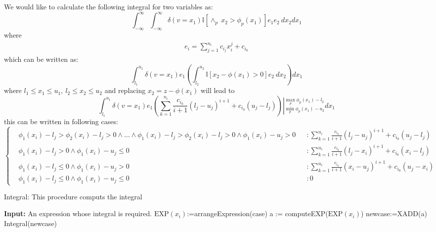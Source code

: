\documentclass[11pt,a4paper]{article}
\newcommand{\EXP}{\text{EXP}}
\newcommand{\ind}[1]{\mathbb{I}[#1]}
\begin{document}
We would like to calculate the following integral for two variables  as:
\begin{equation}
\int_{-\infty}^{\infty} \int_{-\infty}^{\infty} \delta(v=x_1)\ind {\wedge_p\ x_2>\phi_p(x_1)} e_1e_2 \ dx_2dx_1
\end{equation}
where 
\begin{eqnarray}
e_i = \sum_{j=1}^{n_i} c_{i_j}x_i^j + c_{i_0}
\end{eqnarray}
which can be written as:
\begin{equation}
\int_{l_1}^{u_1} \delta(v=x_1)e_1\left( \int_{l_2}^{u_2} \ind {x_2-\phi(x_1)>0} e_2 \ dx_2\right)dx_1
\end{equation}
where $l_1\leq x_1\leq u_1,\ l_2\leq x_2\leq u_2$
and replacing $x_2=z-\phi(x_1)$ will lead to 
\begin{equation}
\int_{l_1}^{u_1} \delta(v=x_1)e_1\left( \sum_{k=1}^{n_i} \frac{c_{i_k}}{i+1}(l_j-u_j)^{i+1} + c_{i_0}(u_j-l_j)  \right) \left|_{\min_p\phi_p(x_1)-u_2}^{\max_p\phi_p(x_1)-l_2} \right. dx_1
\end{equation}
this can be written in following cases:
\begin{equation}
\label{case1}
\left\lbrace
\begin{aligned}
&\phi_1(x_i)-l_j > \phi_2(x_i)-l_j > 0 \wedge \ldots \wedge \phi_1(x_i)-l_j > \phi_2(x_i)-l_j > 0 \wedge \phi_1(x_i)-u_j > 0  &&:  \sum_{k=1}^{n_i} \frac{c_{i_k}}{i+1}(l_j-u_j)^{i+1} + c_{i_0}(u_j-l_j) \\
&\phi_1(x_i)-l_j > 0 \wedge \phi_1(x_i)-u_j \leq 0 &&:  \sum_{k=1}^{n_i} \frac{c_{i_k}}{i+1}(l_j-x_i)^{i+1} + c_{i_0}(x_i-l_j) \\
&\phi_1(x_i)-l_j \leq 0 \wedge \phi_1(x_i)-u_j > 0 &&:  \sum_{k=1}^{n_i} \frac{c_{i_k}}{i+1}(x_i-u_j)^{i+1} + c_{i_0}(u_j-x_i) \\ 
&\phi_1(x_i)-l_j \leq 0 \wedge \phi_1(x_i)-u_j \leq 0 &&:  0
\end{aligned}
\right .
\end{equation}


\newpage

\begin{algorithm}[h!]
\caption{Integral: This procedure computs the integral}
\label{alg1}
\begin{algorithmic}
\STATE \textbf{Input:} An expression whose integral is required.
\STATE $\EXP(x_i)$:=arrangeExpression(case) 
\STATE a := computeEXP($\EXP(x_i)$)
\STATE newcase:=XADD(a)
\STATE Integral(newcase)
\ENDFOR
\end{algorithmic}
\end{algorithm}
\end{document}
